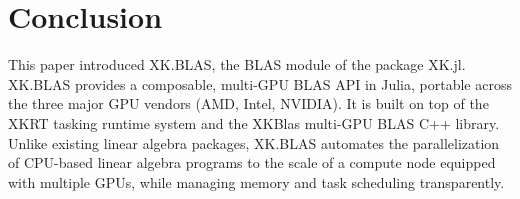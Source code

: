 \documentclass{juliacon}
\begin{document}





\section{Conclusion} \label{sec:conclusion}

This paper introduced XK.BLAS, the BLAS module of the package XK.jl.
XK.BLAS provides a composable, multi-GPU BLAS API in Julia, portable across the three major GPU vendors (AMD, Intel, NVIDIA).  
It is built on top of the XKRT tasking runtime system and the XKBlas multi-GPU BLAS C++ library.
Unlike existing linear algebra packages, XK.BLAS automates the parallelization of CPU-based linear algebra programs to the scale of a compute node equipped with multiple GPUs, while managing memory and task scheduling transparently.
\end{document}
